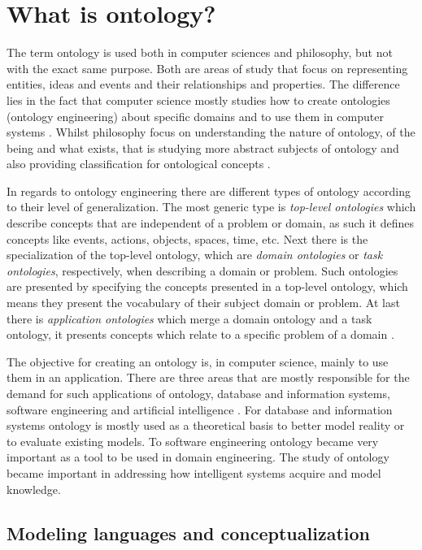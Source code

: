 \section{What is ontology?}

The term ontology is used both in computer sciences and philosophy, but not with the exact same purpose. Both are areas of study that focus on representing entities, ideas and events and their relationships and properties. The difference lies in the fact that computer science mostly studies how to create ontologies (ontology engineering) about specific domains and to use them in computer systems \citep{gruber2009ontology}. Whilst philosophy focus on understanding the nature of ontology, of the being and what exists, that is studying more abstract subjects of ontology and also providing classification for ontological concepts \citep{guizzardi_ontological_2005}.

In regards to ontology engineering there are different types of ontology according to their level of generalization. The most generic type is \textit{top-level ontologies} which describe concepts that are independent of a problem or domain, as such it defines concepts like events, actions, objects, spaces, time, etc. Next there is the specialization of the top-level ontology, which are \textit{domain ontologies} or \textit{task ontologies}, respectively, when describing a domain or problem. Such ontologies are presented by specifying the concepts presented in a top-level ontology, which means they present the vocabulary of their subject domain or problem. At last there is \textit{application ontologies} which merge a domain ontology and a task ontology, it presents concepts which relate to a specific problem of a domain \citep{guarino1998ontoformal}.

The objective for creating an ontology is, in computer science, mainly to use them in an application. There are three areas that are mostly responsible for the demand for such applications of ontology, database and information systems, software engineering and artificial intelligence \citep{smith2001ontology}. For database and information systems ontology is mostly used as a theoretical basis to better model reality or to evaluate existing models. To software engineering ontology became very important as a tool to be used in domain engineering. The study of ontology became important in addressing how intelligent systems acquire and model knowledge.

\subsection{Modeling languages and conceptualization}

